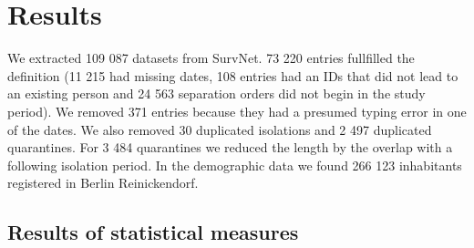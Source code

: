 \documentclass[
]{article}
\newenvironment{Shaded}{\begin{snugshade}}{\end{snugshade}}
\newcommand{\FunctionTok}[1]{\textcolor[rgb]{0.00,0.00,0.00}{#1}}
\newcommand{\NormalTok}[1]{#1}
\newcommand{\OtherTok}[1]{\textcolor[rgb]{0.56,0.35,0.01}{#1}}
\newcommand{\SpecialCharTok}[1]{\textcolor[rgb]{0.00,0.00,0.00}{#1}}
\begin{document}
\hypertarget{results}{%
\section{Results}\label{results}}

\begin{Shaded}
\end{Shaded}

We extracted 109 087 datasets from SurvNet. 73 220 entries fullfilled
the definition (11 215 had missing dates, 108 entries had an IDs that
did not lead to an existing person and 24 563 separation orders did not
begin in the study period). We removed 371 entries because they had a
presumed typing error in one of the dates. We also removed 30 duplicated
isolations and 2 497 duplicated quarantines. For 3 484 quarantines we
reduced the length by the overlap with a following isolation period. In
the demographic data we found 266 123 inhabitants registered in Berlin
Reinickendorf.

\hypertarget{results-of-statistical-measures}{%
\subsection{Results of statistical
measures}\label{results-of-statistical-measures}}
\end{document}

